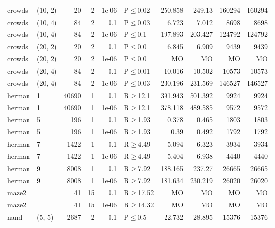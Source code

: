 \begin{longtable}{llrrrlrrrr}
 crowds        & (10, 2)   &     	20 &   2 & 1e-06 & P$\leq$0.02  & 250.858  & 249.13   & 160294  & 160294  \\
 crowds        & (10, 4)   &     	84 &   2 & 0.1   & P$\leq$0.03  & 6.723    & 7.012    & 8698    & 8698    \\
 crowds        & (10, 4)   &     	84 &   2 & 1e-06 & P$\leq$0.1   & 197.893  & 203.427  & 124792  & 124792  \\
 crowds        & (20, 2)   &     	20 &   2 & 0.1   & P$\leq$0.0   & 6.845    & 6.909    & 9439    & 9439    \\
 crowds        & (20, 2)   &     	20 &   2 & 1e-06 & P$\leq$0.0   & MO       & MO       & MO      & MO      \\
 crowds        & (20, 4)   &     	84 &   2 & 0.1   & P$\leq$0.01  & 10.016   & 10.502   & 10573   & 10573   \\
 crowds        & (20, 4)   &     	84 &   2 & 1e-06 & P$\leq$0.03  & 230.196  & 231.569  & 146527  & 146527  \\
 herman        & 1         &  	40690 &   1 & 0.1   & R$\geq$12.1  & 391.943  & 501.392  & 9924    & 9924    \\
 herman        & 1         &  	40690 &   1 & 1e-06 & R$\geq$12.1  & 378.118  & 489.585  & 9572    & 9572    \\
 herman        & 5         &    	196 &   1 & 0.1   & R$\geq$1.93  & 0.378    & 0.465    & 1803    & 1803    \\
 herman        & 5         &    	196 &   1 & 1e-06 & R$\geq$1.93  & 0.39     & 0.492    & 1792    & 1792    \\
 herman        & 7         &   	1422 &   1 & 0.1   & R$\geq$4.49  & 5.094    & 6.323    & 3934    & 3934    \\
 herman        & 7         &   	1422 &   1 & 1e-06 & R$\geq$4.49  & 5.404    & 6.938    & 4440    & 4440    \\
 herman        & 9         &   	8008 &   1 & 0.1   & R$\geq$7.92  & 188.165  & 237.27   & 26665   & 26665   \\
 herman        & 9         &   	8008 &   1 & 1e-06 & R$\geq$7.92  & 181.634  & 230.219  & 26020   & 26020   \\
 maze2         &           &     	41 &  15 & 0.1   & R$\geq$17.52 & MO       & MO       & MO      & MO      \\
 maze2         &           &     	41 &  15 & 1e-06 & R$\geq$14.32 & MO       & MO       & MO      & MO      \\
 nand          & (5, 5)    &   	2687 &   2 & 0.1   & P$\leq$0.5   & 22.732   & 28.895   & 15376   & 15376   \\

\end{longtable}
